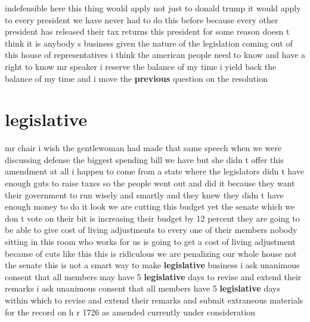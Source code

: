 \documentclass{article}
\begin{document}
indefensible here this thing would apply not just to donald trump it would apply to every president we have never had to do this before because every other president has released their tax returns this president for some reason doesn t think it is anybody s business given the nature of the legislation coming out of this house of representatives i think the american people need to know and have a right to know mr speaker i reserve the balance of my time
\vspace{8mm}
i yield back the balance of my time and i move the {\bf \color{red} previous} question on the resolution\pagebreak

\section*{legislative}
mr chair i wish the gentlewoman had made that same speech when we were discussing defense the biggest spending bill we have but she didn t offer this amendment at all i happen to come from a state where the legislators didn t have enough guts to raise taxes so the people went out and did it because they want their government to run wisely and smartly and they knew they didn t have enough money to do it look we are cutting this budget yet the senate which we don t vote on their bit is increasing their budget by 12 percent they are going to be able to give cost of living adjustments to every one of their members nobody sitting in this room who works for us is going to get a cost of living adjustment because of cuts like this this is ridiculous we are penalizing our whole house not the senate this is not a smart way to make {\bf \color{red} legislative} business
\vspace{8mm}
i ask unanimous consent that all members may have 5 {\bf \color{red} legislative} days to revise and extend their remarks
\vspace{8mm}
i ask unanimous consent that all members have 5 {\bf \color{red} legislative} days within which to revise and extend their remarks and submit extraneous materials for the record on h r 1726 as amended currently under consideration\pagebreak
\end{document}
